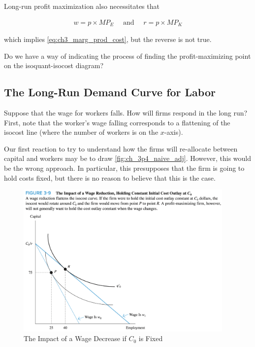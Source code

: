 Long-run profit maximization also necessitates that

\begin{align}
    w=p \times M P_E \quad \text { and } \quad r=p \times M P_K
\end{align}

which implies \eqref{eq:ch3_marg_prod_cost}, but the 
reverse is not true.

\begin{questions}
    Do we have a way of indicating the process 
    of finding the profit-maximizing point on
    the isoquant-isocost diagram?
\end{questions}

\subsection{The Long-Run Demand Curve for Labor}

Suppose that the wage for workers 
falls.
How will firms respond in the long run?
First, note that the worker's wage falling 
corresponds to a flattening of the 
isocost line (where the number of workers 
is on the $x$-axis).

Our first reaction to try to 
understand how the firms will re-allocate between capital 
and workers may be to draw 
\autoref{fig:ch_3p4_naive_adj}. However, 
this would be the wrong 
approach. In particular, this presupposes 
that the firm is going to hold costs fixed, but 
there is no reason to believe that this is the case.

\FloatBarrier

\begin{figure}[!htb]
    \centering
        \includegraphics[width=0.95\textwidth]{../input/ch_3p4_naive_adj.png}
    \caption{The Impact of a Wage Decrease if $C_0$ is Fixed}
    \label{fig:ch_3p4_naive_adj}
\end{figure}

